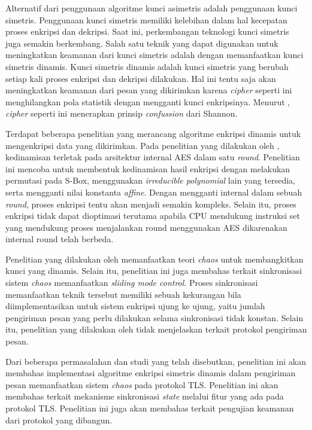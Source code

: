 Alternatif dari penggunaan algoritme kunci asimetris adalah penggunaan kunci simetris. Penggunaan kunci simetris memiliki kelebihan dalam hal kecepatan proses enkripsi dan dekripsi. Saat ini, perkembangan teknologi kunci simetris juga semakin berkembang. Salah satu teknik yang dapat digunakan untuk meningkatkan keamanan dari kunci simetris adalah dengan memanfaatkan kunci simetris dinamis. Kunci simetris dinamis adalah kunci simetris yang berubah setiap kali proses enkripsi dan dekripsi dilakukan. Hal ini tentu saja akan meningkatkan keamanan dari pesan yang dikirimkan karena \emph{cipher} seperti ini menghilangkan pola statistik dengan mengganti kunci enkripsinya. Menurut \textcite{munir2019}, \emph{cipher} seperti ini menerapkan prinsip \emph{confussion} dari Shannon.

Terdapat beberapa penelitian yang merancang algoritme enkripsi dinamis untuk mengenkripsi data yang dikirimkan. Pada penelitian yang dilakukan oleh \textcite{singh2019}, kedinamisan terletak pada arsitektur internal AES dalam satu \emph{round}. Penelitian ini mencoba untuk membentuk kedinamisan hasil enkripsi dengan melakukan permutasi pada S-Box, menggunakan \emph{irreducible polynomial} lain yang tersedia, serta mengganti nilai konstanta \emph{affine}. Dengan mengganti internal dalam sebuah \emph{round}, proses enkripsi tentu akan menjadi semakin kompleks. Selain itu, proses enkripsi tidak dapat dioptimasi terutama apabila CPU mendukung instruksi set yang mendukung proses menjalankan round menggunakan AES dikarenakan internal round telah berbeda.

Penelitian yang dilakukan oleh \textcite{lin2021} memanfaatkan teori \emph{chaos} untuk membangkitkan kunci yang dinamis. Selain itu, penelitian ini juga membahas terkait sinkronisasi sistem \emph{chaos} memanfaatkan \emph{sliding mode control}. Proses sinkronisasi memanfaatkan teknik tersebut memiliki sebuah kekurangan bila diimplementasikan untuk sistem enkripsi ujung ke ujung, yaitu jumlah pengiriman pesan yang perlu dilakukan selama sinkronisasi tidak konstan. Selain itu, penelitian yang dilakukan oleh \textcite{lin2021} tidak menjelaskan terkait protokol pengiriman pesan.

Dari beberapa permasalahan dan studi yang telah disebutkan, penelitian ini akan membahas implementasi algoritme enkripsi simetris dinamis dalam pengiriman pesan memanfaatkan sistem \emph{chaos} pada protokol TLS. Penelitian ini akan membahas terkait mekanisme sinkronisasi \emph{state} melalui fitur yang ada pada protokol TLS. Penelitian ini juga akan membahas terkait pengujian keamanan dari protokol yang dibangun.

